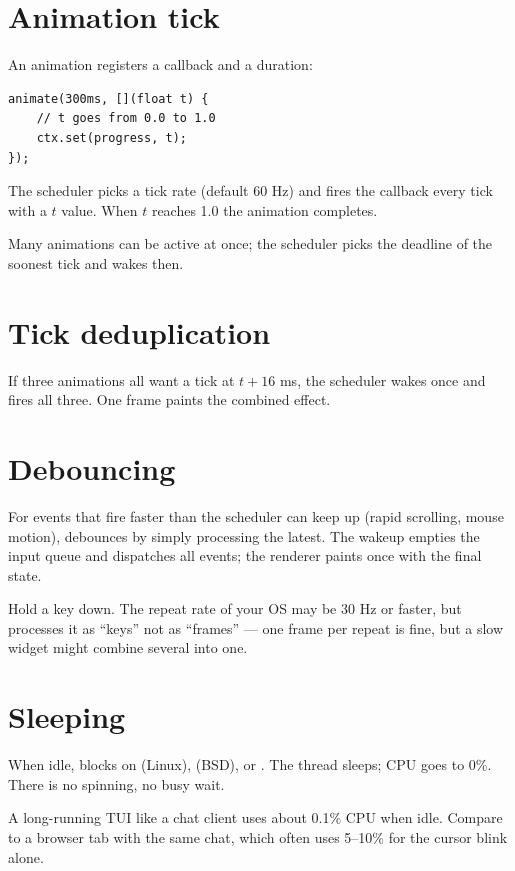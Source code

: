 \section{Animation tick}

An animation registers a callback and a duration:

\begin{lstlisting}
animate(300ms, [](float t) {
    // t goes from 0.0 to 1.0
    ctx.set(progress, t);
});
\end{lstlisting}

The scheduler picks a tick rate (default 60 Hz) and fires the
callback every tick with a $t$ value. When $t$ reaches 1.0 the
animation completes.

Many animations can be active at once; the scheduler picks the
deadline of the soonest tick and wakes then.

\section{Tick deduplication}

If three animations all want a tick at $t + 16$ ms, the
scheduler wakes once and fires all three. One frame paints the
combined effect.

\section{Debouncing}

For events that fire faster than the scheduler can keep up
(rapid scrolling, mouse motion), \maya{} debounces by simply
processing the latest. The wakeup empties the input queue and
dispatches all events; the renderer paints once with the final
state.

\begin{tryit}
Hold a key down. The repeat rate of your OS may be 30 Hz or
faster, but \maya{} processes it as ``keys'' not as ``frames''
--- one frame per repeat is fine, but a slow widget might
combine several into one.
\end{tryit}

\section{Sleeping}

When idle, \maya{} blocks on  (Linux),
 (BSD), or . The thread sleeps; CPU
goes to 0\%. There is no spinning, no busy wait.

\begin{funfact}
A long-running TUI like a chat client uses about 0.1\% CPU when
idle. Compare to a browser tab with the same chat, which often
uses 5--10\% for the cursor blink alone.
\end{funfact}

